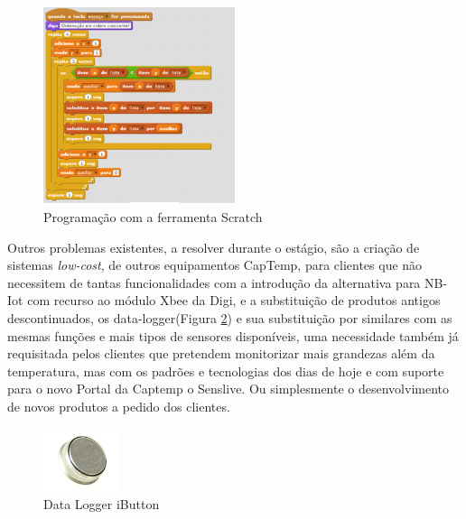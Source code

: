 \begin{figure}[ht]
  \centering
  \includegraphics[width=0.50\textwidth]{images/scratch.png}
  \caption{ Programação com a ferramenta Scratch}\label{scratch}
\end{figure}

\par Outros problemas existentes, a resolver durante o estágio, são a criação de sistemas \textit{low-cost}, de outros equipamentos CapTemp, para clientes que não necessitem de tantas funcionalidades com a introdução da alternativa para NB-Iot com recurso ao módulo Xbee da Digi, e a substituição de produtos antigos descontinuados, os data-logger(Figura \ref{ds1921}) e sua substituição por similares com as mesmas funções e mais tipos de sensores disponíveis, uma necessidade também já requisitada pelos clientes que pretendem monitorizar mais grandezas além da temperatura, mas com os padrões e tecnologias dos dias de hoje e com suporte para o novo Portal da Captemp o Senslive. Ou simplesmente o desenvolvimento de novos produtos a pedido dos clientes.

\begin{figure}[htb]
  \centering
  \includegraphics[width=0.20\textwidth]{images/ds1921.jpg}
  \caption{Data Logger iButton}\label{ds1921}
\end{figure}


